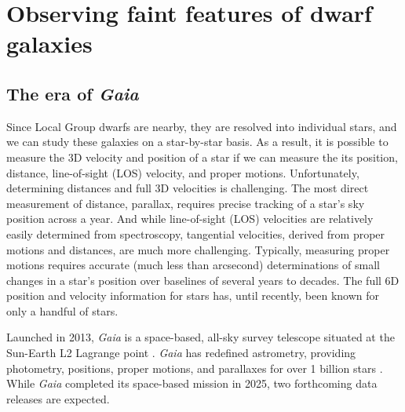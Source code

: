 \section{Observing faint features of dwarf
galaxies}\label{observing-faint-features-of-dwarf-galaxies}

\subsection{\texorpdfstring{The era of
\emph{Gaia}}{The era of Gaia}}\label{the-era-of-gaia}

Since Local Group dwarfs are nearby, they are resolved into individual
stars, and we can study these galaxies on a star-by-star basis. As a
result, it is possible to measure the 3D velocity and position of a star
if we can measure the its position, distance, line-of-sight (LOS)
velocity, and proper motions. Unfortunately, determining distances and
full 3D velocities is challenging. The most direct measurement of
distance, parallax, requires precise tracking of a star's sky position
across a year. And while line-of-sight (LOS) velocities are relatively
easily determined from spectroscopy, tangential velocities, derived from
proper motions and distances, are much more challenging. Typically,
measuring proper motions requires accurate (much less than arcsecond)
determinations of small changes in a star's position over baselines of
several years to decades. The full 6D position and velocity information
for stars has, until recently, been known for only a handful of stars.

Launched in 2013, \emph{Gaia} is a space-based, all-sky survey telescope
situated at the Sun-Earth L2 Lagrange point
\citep{gaiacollaboration+2016}. \emph{Gaia} has redefined astrometry,
providing photometry, positions, proper motions, and parallaxes for over
1 billion stars \citep{gaiacollaboration+2021}. While \emph{Gaia}
completed its space-based mission in 2025, two forthcoming data releases
are expected.

